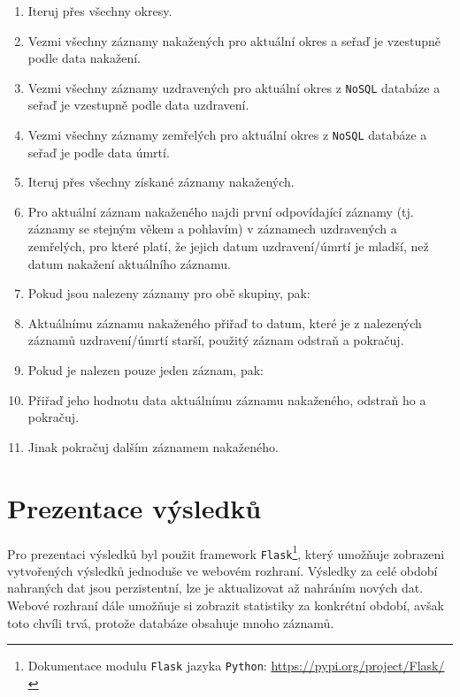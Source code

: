 \documentclass[11pt,a4paper,titlepage]{article}
\begin{document}
\begin{enumerate}
    \item Iteruj přes všechny okresy.
    \setlength{\itemindent}{1em}
    \item Vezmi všechny záznamy nakažených pro aktuální okres a seřaď je vzestupně podle data nakažení.
    \item Vezmi všechny záznamy uzdravených pro aktuální okres z \texttt{NoSQL} databáze a seřaď je vzestupně podle data uzdravení.
    \item Vezmi všechny záznamy zemřelých pro aktuální okres z \texttt{NoSQL} databáze a seřaď je podle data úmrtí.
    \item Iteruj přes všechny získané záznamy nakažených.
    \setlength{\itemindent}{2em}
    \item Pro aktuální záznam nakaženého najdi první odpovídající záznamy (tj. záznamy se stejným věkem a pohlavím) v záznamech uzdravených a zemřelých, pro které platí, že jejich datum uzdravení/úmrtí je mladší, než datum nakažení aktuálního záznamu.
    \item Pokud jsou nalezeny záznamy pro obě skupiny, pak:
    \setlength{\itemindent}{3em}
    \item Aktuálnímu záznamu nakaženého přiřaď to datum, které je z nalezených záznamů uzdravení/úmrtí starší, použitý záznam odstraň a pokračuj.
     \setlength{\itemindent}{2em}
    \item Pokud je nalezen pouze jeden záznam, pak:
     \setlength{\itemindent}{3em}
        \item Přiřaď jeho hodnotu data aktuálnímu záznamu nakaženého, odstraň ho a pokračuj.
    \setlength{\itemindent}{2em}
    \item Jinak pokračuj dalším záznamem nakaženého.
    \setlength{\itemindent}{0em}
\end{enumerate}
    
\newpage
\section{Prezentace výsledků}
Pro prezentaci výsledků byl použit framework \texttt{Flask}\footnote{Dokumentace modulu \texttt{Flask} jazyka \texttt{Python}\cite{python}: \url{https://pypi.org/project/Flask/}}, který umožňuje zobrazeni vytvořených výsledků jednoduše ve webovém rozhraní.
Výsledky za celé období nahraných dat jsou perzistentní, lze je aktualizovat až nahráním nových dat. Webové rozhraní dále umožňuje si zobrazit statistiky za konkrétní období, avšak toto chvíli trvá, protože databáze obsahuje mnoho záznamů.
\end{document}

